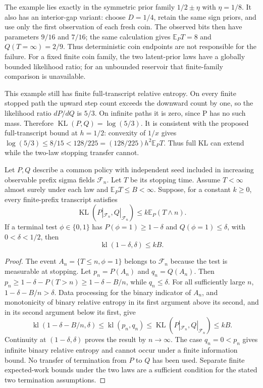 The example lies exactly in the symmetric prior family $1/2\pm\eta$ with
$\eta=1/8$. It also has an interior-gap variant: choose $D=1/4$, retain the
same sign priors, and use only the first observation of each fresh coin.
The observed bits then have parameters $9/16$ and $7/16$; the same calculation
gives $\mathbb E_PT=8$ and $Q(T=\infty)=2/9$. Thus deterministic coin
endpoints are not responsible for the failure. For a fixed finite coin family,
the two latent-prior laws have a globally bounded likelihood ratio; for an
unbounded reservoir that finite-family comparison is unavailable.

This example still has finite full-transcript relative entropy. On every finite
stopped path the upward step count exceeds the downward count by one, so the
likelihood ratio $dP/dQ$ is $5/3$. On infinite paths it is zero, since P has no
such mass. Therefore $\operatorname{KL}(P,Q)=\log(5/3)$. It is consistent with
the proposed full-transcript bound at $h=1/2$: convexity of $1/x$ gives
$\log(5/3)\le8/15<128/225=(128/225)h^2\mathbb E_PT$.
Thus full KL can extend while the two-law stopping transfer cannot.

\begin{proposition}
Let $P,Q$ describe a common policy with independent seed included in increasing
observable prefix sigma fields $\mathcal F_n$. Let $T$ be its stopping time.
Assume $T<\infty$ almost surely under each law and $\mathbb E_PT\le B<\infty$.
Suppose, for a constant $k\ge0$, every finite-prefix transcript satisfies
\[
 \operatorname{KL}(P|_{\mathcal F_n},Q|_{\mathcal F_n})
       \le k\mathbb E_P(T\wedge n).
\]
If a terminal test $\phi\in\{0,1\}$ has
$P(\phi=1)\ge1-\delta$ and $Q(\phi=1)\le\delta$, with $0<\delta<1/2$, then
\[
 \operatorname{kl}(1-\delta,\delta)\le kB.
\]
\end{proposition}
\begin{proof}
The event $A_n=\{T\le n,\phi=1\}$ belongs to $\mathcal F_n$ because the
test is measurable at stopping. Let $p_n=P(A_n)$ and $q_n=Q(A_n)$.
Then $p_n\ge1-\delta-P(T>n)\ge1-\delta-B/n$, while $q_n\le\delta$.
For all sufficiently large $n$, $1-\delta-B/n>\delta$.
Data processing for the binary indicator of $A_n$, and monotonicity of binary
relative entropy in its first argument above its second, and in its second
argument below its first, give
\[
 \operatorname{kl}(1-\delta-B/n,\delta)
 \le\operatorname{kl}(p_n,q_n)
 \le\operatorname{KL}(P|_{\mathcal F_n},Q|_{\mathcal F_n})\le kB.
\]
Continuity at $(1-\delta,\delta)$ proves the result by $n\to\infty$.
The case $q_n=0<p_n$ gives infinite binary relative entropy and cannot occur
under a finite information bound. No transfer of termination from $P$ to $Q$
has been used. Separate finite expected-work bounds under the two laws are
a sufficient condition for the stated two termination assumptions.
\end{proof}

